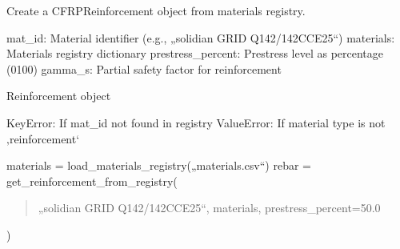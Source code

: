 \documentclass[a4paper,11pt,german]{sphinxmanual}
\begin{document}

\begin{fulllineitems}
\label{\detokenize{api/analysis_core:core.analysis_core.material_methods.get_cfrp_reinforcement_from_registry}}
\pysigstartsignatures
\pysiglinewithargsret
{}
{\sphinxparamcomma {}\sphinxparamcomma {}\sphinxparamcomma {}}
{}
\pysigstopsignatures
\sphinxAtStartPar
Create a CFRP\sphinxhyphen{}Reinforcement object from materials registry.
\begin{description}
\sphinxAtStartPar
mat\_id: Material identifier (e.g., „solidian GRID Q142/142\sphinxhyphen{}CCE\sphinxhyphen{}25“)
materials: Materials registry dictionary
prestress\_percent: Prestress level as percentage (0\sphinxhyphen{}100)
gamma\_s: Partial safety factor for reinforcement

\sphinxAtStartPar
Reinforcement object

\sphinxAtStartPar
KeyError: If mat\_id not found in registry
ValueError: If material type is not ‚reinforcement‘

\sphinxAtStartPar
materials = load\_materials\_registry(„materials.csv“)
rebar = get\_reinforcement\_from\_registry(
\begin{quote}

\sphinxAtStartPar
„solidian GRID Q142/142\sphinxhyphen{}CCE\sphinxhyphen{}25“,
materials,
prestress\_percent=50.0
\end{quote}

\sphinxAtStartPar
)

\end{description}

\end{fulllineitems}
\end{document}
